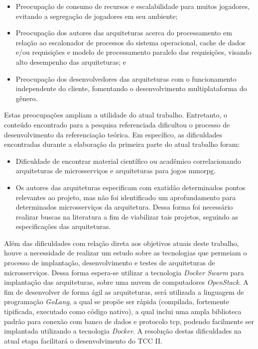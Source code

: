 \begin{itemize}
  \item Preocupação de consumo de recursos e escalabilidade para muitos jogadores, evitando a segregação de jogadores em seu ambiente;
  \item Preocupação dos autores das arquiteturas acerca do processamento em relação ao escalonador de processos do sistema operacional, cache de dados e/ou requisições e modelo de processamento paralelo das requisições, visando alto desempenho das arquiteturas; e
  \item Preocupação dos desenvolvedores das arquiteturas com o funcionamento independente do cliente, fomentando o desenvolvimento multiplataforma do gênero.
\end{itemize}

Estas preocupações ampliam a utilidade do atual trabalho.
%
Entretanto, o conteúdo encontrado para a pesquisa referenciada dificultou o processo de desenvolvimento da referenciação teórica.
%
Em específico, as dificuldades encontradas durante a elaboração da primeira parte do atual trabalho foram:

\begin{itemize}
  \item Dificuldade de encontrar material científico ou acadêmico correlacionando arquiteturas de microsserviços e arquiteturas para jogos \ac{mmorpg}.
  \item Os autores das arquiteturas especificam com exatidão determinados pontos relevantes ao projeto, mas não foi identificado um aprofundamento para determinados microsserviços da arquitetura. Dessa forma foi necessário realizar buscas na literatura a fim de viabilizar tais projetos, seguindo as especificações das arquiteturas.
\end{itemize}

Além das dificuldades com relação direta aos objetivos atuais deste trabalho, houve a necessidade de realizar um estudo sobre as tecnologias que permeiam o processo de implantação, desenvolvimento e testes de arquiteturas de microsserviços.
%
Dessa forma espera-se utilizar a tecnologia \textit{Docker Swarm} para implantação das arquiteturas, sobre uma nuvem de computadores \textit{OpenStack}.
%
A fim de desenvolver de forma ágil as arquiteturas, será utilizada a linguagem de programação \textit{GoLang}, a qual se propõe ser rápida (compilada, fortemente tipificada, executado como código nativo), a qual inclui uma ampla biblioteca padrão para conexão com banco de dados e protocolo \ac{tcp}, podendo facilmente ser implantada utilizando a tecnologia \textit{Docker}.
%
A resolução destas dificuldades na atual etapa facilitará o desenvolvimento do TCC II.

